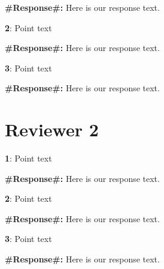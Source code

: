 \documentclass{article}
\begin{document}
\begin{flushleft}
\textbf{\#Response\#:} 
Here is our response text.
\end{flushleft}

\begin{flushleft}
\textbf{2}: Point text
\end{flushleft}

\begin{flushleft}
\textbf{\#Response\#:} 
Here is our response text.
\end{flushleft}

\begin{flushleft}
\textbf{3}: Point text
\end{flushleft}

\begin{flushleft}
\textbf{\#Response\#:} 
Here is our response text.
\end{flushleft}

\section*{Reviewer 2}

\begin{flushleft}
\textbf{1}: Point text
\end{flushleft}

\begin{flushleft}
\textbf{\#Response\#:} 
Here is our response text.
\end{flushleft}

\begin{flushleft}
\textbf{2}: Point text
\end{flushleft}

\begin{flushleft}
\textbf{\#Response\#:} 
Here is our response text.
\end{flushleft}

\begin{flushleft}
\textbf{3}: Point text
\end{flushleft}

\begin{flushleft}
\textbf{\#Response\#:} 
Here is our response text.
\end{flushleft}
\end{document}
